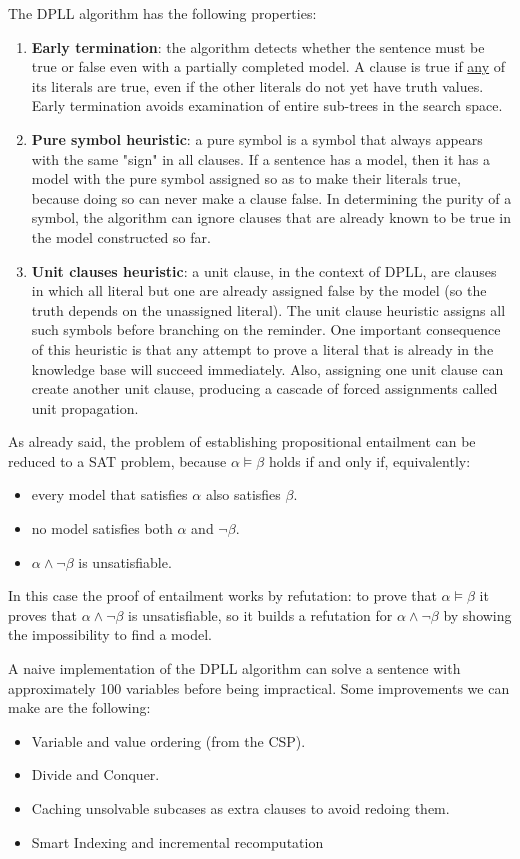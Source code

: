 \documentclass{article}
\begin{document}
\noindent The DPLL algorithm has the following properties:
\begin{enumerate}
    \item \textbf{Early termination}: the algorithm detects whether the sentence must be true or false even with a partially completed model. A clause is true if \underline{any} of its literals are true, even if the other literals do not yet have truth values. Early termination avoids examination of entire sub-trees in the search space.
    \item \textbf{Pure symbol heuristic}: a pure symbol is a symbol that always appears with the same "sign" in all clauses. If a sentence has a model, then it has a model with the pure symbol assigned so as to make their literals true, because doing so can never make a clause false. In determining the purity of a symbol, the algorithm can ignore clauses that are already known to be true in the model constructed so far.
    \item \textbf{Unit clauses heuristic}: a unit clause, in the context of DPLL, are clauses in which all literal but one are already assigned false by the model (so the truth depends on the unassigned literal). The unit clause heuristic assigns all such symbols before branching on the reminder. One important consequence of this heuristic is that any attempt to prove a literal that is already in the knowledge base will succeed immediately. Also, assigning one unit clause can create another unit clause, producing a cascade of forced assignments called unit propagation.   
\end{enumerate}

As already said, the problem of establishing propositional entailment can be reduced to a SAT problem, because \(\alpha \models \beta\) holds if and only if, equivalently:
\begin{itemize}
    \item every model that satisfies \(\alpha\) also satisfies \(\beta\).
    \item no model satisfies both \(\alpha\) and \(\neg \beta\).
    \item \(\alpha \land \neg \beta\) is unsatisfiable.
\end{itemize}

\noindent In this case the proof of entailment works by refutation: to prove that \(\alpha \models \beta\) it proves that \(\alpha \land \neg \beta\) is unsatisfiable, so it builds a refutation for \(\alpha \land \neg \beta\) by showing the impossibility to find a model.  

A naive implementation of the DPLL algorithm can solve a sentence with approximately 100 variables before being impractical. Some improvements we can make are the following:
\begin{itemize}
    \item Variable and value ordering (from the CSP).
    \item Divide and Conquer.
    \item Caching unsolvable subcases as extra clauses to avoid redoing them.
    \item Smart Indexing and incremental recomputation 
\end{itemize}
\end{document}
